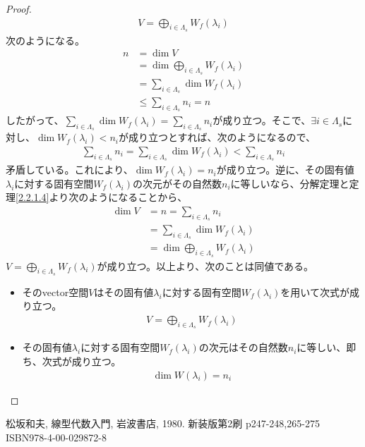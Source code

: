 \documentclass[dvipdfmx]{jsarticle}
\begin{document}
\begin{proof}
\begin{align*}
V = \bigoplus_{i \in \varLambda_{s}} {W_{f}\left( \lambda_{i} \right)}
\end{align*}
次のようになる。
\begin{align*}
n &= \dim V\\
&= \dim{\bigoplus_{i \in \varLambda_{s}} {W_{f}\left( \lambda_{i} \right)}}\\
&= \sum_{i \in \varLambda_{s}} {\dim{W_{f}\left( \lambda_{i} \right)}}\\
&\leq \sum_{i \in \varLambda_{s}} n_{i} = n
\end{align*}
したがって、$\sum_{i \in \varLambda_{s}} {\dim{W_{f}\left( \lambda_{i} \right)}} = \sum_{i \in \varLambda_{s}} n_{i}$が成り立つ。そこで、$\exists i \in \varLambda_{s}$に対し、$\dim{W_{f}\left( \lambda_{i} \right)} < n_{i}$が成り立つとすれば、次のようになるので、
\begin{align*}
\sum_{i \in \varLambda_{s}} n_{i} = \sum_{i \in \varLambda_{s}} {\dim{W_{f}\left( \lambda_{i} \right)}} < \sum_{i \in \varLambda_{s}} n_{i}
\end{align*}
矛盾している。これにより、$\dim{W_{f}\left( \lambda_{i} \right)} = n_{i}$が成り立つ。逆に、その固有値$\lambda_{i}$に対する固有空間$W_{f}\left( \lambda_{i} \right)$の次元がその自然数$n_{i}$に等しいなら、分解定理と定理\ref{2.2.1.4}より次のようになることから、
\begin{align*}
\dim V &= n = \sum_{i \in \varLambda_{s}} n_{i}\\
&= \sum_{i \in \varLambda_{s}} {\dim{W_{f}\left( \lambda_{i} \right)}}\\
&= \dim{\bigoplus_{i \in \varLambda_{s}} {W_{f}\left( \lambda_{i} \right)}}
\end{align*}
$V = \bigoplus_{i \in \varLambda_{s}} {W_{f}\left( \lambda_{i} \right)}$が成り立つ。以上より、次のことは同値である。
\begin{itemize}
\item
  そのvector空間$V$はその固有値$\lambda_{i}$に対する固有空間$W_{f}\left( \lambda_{i} \right)$を用いて次式が成り立つ。
\begin{align*}
V = \bigoplus_{i \in \varLambda_{s}} {W_{f}\left( \lambda_{i} \right)}
\end{align*}
\item
  その固有値$\lambda_{i}$に対する固有空間$W_{f}\left( \lambda_{i} \right)$の次元はその自然数$n_{i}$に等しい、即ち、次式が成り立つ。
\begin{align*}
\dim{W\left( \lambda_{i} \right)} = n_{i}
\end{align*}
\end{itemize}
\end{proof}
\begin{thebibliography}{50}
    松坂和夫, 線型代数入門, 岩波書店, 1980. 新装版第2刷 p247-248,265-275 ISBN978-4-00-029872-8
\end{thebibliography}
\end{document}
